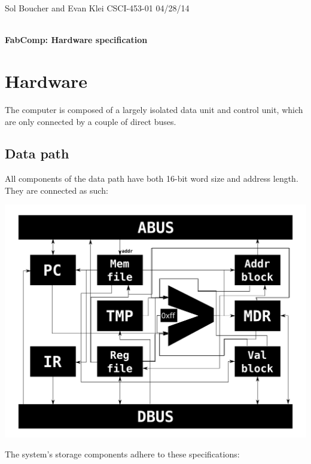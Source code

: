 \documentclass[12pt]{article}
\begin{document}
\setlength{\parindent}{0pt}

\begin{framed}
Sol Boucher and Evan Klei \hfill CSCI-453-01 \hfill 04/28/14 \\
\vspace{6pt} \\
\centerline{\textbf{\huge FabComp: Hardware specification}}
\end{framed}

\section{Hardware}
The computer is composed of a largely isolated data unit and control unit, which are only connected by a couple of direct buses.

\subsection{Data path}
All components of the data path have both 16-bit word size and address length.
They are connected as such:

\includegraphics[width=\textwidth]{datapath}

\pagebreak
The system's storage components adhere to these specifications:
\end{document}
